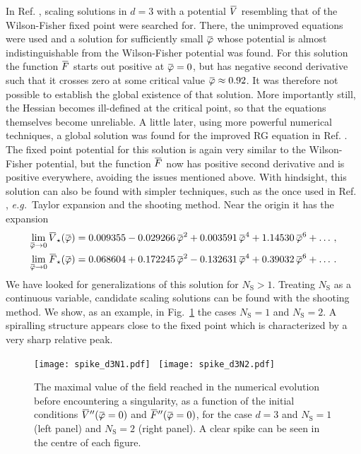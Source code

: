 \documentclass[11pt]{book}
\newcommand{\overbar}[1]{\mkern 1.5mu\overline{\mkern-1.5mu#1\mkern-1.5mu}\mkern 1.5mu}
\newcommand\NS{ N_{\scriptscriptstyle{\mathrm{S}}} }
\newcommand{\bV}{\overbar V}
\newcommand{\bF}{\overbar F}
\newcommand{\bVstar}{\bV_\star}
\newcommand{\bFstar}{\bF_\star}
\newcommand{\bp}{\overbar \varphi}
\newcommand\eg{\textit{e.g.}\ }
\numberwithin{equation}{chapter}
\begin{document}
In Ref. \cite{Percacci:2015wwa}, scaling solutions in $d=3$
with a potential $\bV$ resembling that of the Wilson-Fisher fixed point
were searched for.
There, the unimproved equations were used
and a solution for sufficiently small $\bp$
whose potential is almost indistinguishable from the
Wilson-Fisher potential was found. For this solution the function $\bF$
starts out positive at $\bp = 0$, but has negative
second derivative such that it crosses zero at
some critical value $\bp \approx 0.92$.
It was therefore not possible to establish the global existence of that solution.
More importantly still, the Hessian becomes ill-defined at the
critical point, so that the equations themselves become unreliable.
A little later, using more powerful numerical techniques,
a global solution was found for the improved RG equation in Ref. \cite{Borchardt:2015rxa}.
The fixed point potential for this solution is again
very similar to the Wilson-Fisher potential,
but the function $\bF$ now has positive second derivative
and is positive everywhere, avoiding the issues mentioned above.
With hindsight, this solution can also be found with
simpler techniques, such as the once used in Ref. \cite{Percacci:2015wwa},
\eg Taylor expansion and the shooting method.
Near the origin it has the expansion
\begin{align}
  \lim_{\bp \rightarrow 0} \bVstar(\bp) &= 0.009355 - 0.029266 \, \bp ^2 + 0.003591 \, \bp ^4 + 1.14530 \, \bp ^6 + \dots \,, \\
  \lim_{\bp \rightarrow 0} \bFstar(\bp) &= 0.068604 + 0.172245 \, \bp ^2 - 0.132631 \, \bp ^4 + 0.39032 \, \bp ^6 + \dots \,.
\end{align}
We have looked for generalizations of this solution for $\NS>1$.
Treating $\NS$ as a continuous variable, candidate scaling solutions
can be found with the shooting method.
We show, as an example, in Fig.~\ref{WFN1N2} the cases $\NS=1$ and $\NS=2$.
A spiralling structure appears close to the fixed point which is characterized by a very sharp relative peak.
\begin{figure}
  \texttt{[image: spike\_d3N1.pdf]}
  \
  \texttt{[image: spike\_d3N2.pdf]}
  \caption{
    The maximal value of the field reached in the numerical
    evolution before encountering a singularity, as a function
    of the initial conditions $\bV''(\bp=0)$ and $\bF''(\bp=0)$,
    for the case $d=3$ and $\NS=1$ (left panel) and $\NS=2$ (right panel).
    A clear spike can be seen in the centre of each figure.
  }
  \label{WFN1N2}
\end{figure}
\end{document}
